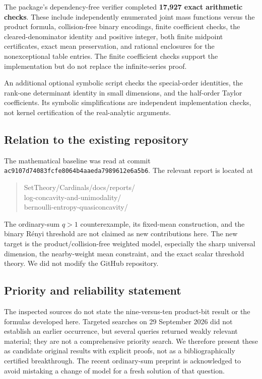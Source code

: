 \documentclass[11pt]{article}
\numberwithin{equation}{section}
\theoremstyle{definition}
\theoremstyle{remark}
\begin{document}
The package's dependency-free verifier completed \textbf{17,927 exact
arithmetic checks}. These include independently enumerated joint mass
functions versus the product formula, collision-free binary encodings,
finite coefficient checks, the cleared-denominator identity and positive
integer, both finite midpoint certificates, exact mean preservation,
and rational enclosures for the nonexceptional table entries. The
finite coefficient checks support the implementation but do not replace
the infinite-series proof.

An additional optional symbolic script checks the special-order
identities, the rank-one determinant identity in small dimensions, and
the half-order Taylor coefficients. Its symbolic simplifications are
independent implementation checks, not kernel certification of the
real-analytic arguments.

\subsection{Relation to the existing repository}
The mathematical baseline was read at commit
\texttt{ac9107d74083fcfe8064b4aaeda7989612e6a5b6}. The relevant report is
located at
\begin{quote}\small\ttfamily
SetTheory/Cardinals/docs/reports/\\
log-concavity-and-unimodality/\\
bernoulli-entropy-quasiconcavity/
\end{quote}
The ordinary-sum $q>1$ counterexample, its fixed-mean construction, and
the binary R\'enyi threshold are not claimed as new contributions here.
The new target is the product/collision-free weighted model, especially
the sharp universal dimension, the nearby-weight mean constraint, and
the exact scalar threshold theory. We did not modify the GitHub
repository.


\subsection{Priority and reliability statement}
The inspected sources do not state the nine-versus-ten product-bit
result or the formulas developed here. Targeted searches on
29 September 2026 did not establish an earlier occurrence, but several
queries returned weakly relevant material; they are not a comprehensive
priority search. We therefore present these as candidate original
results with explicit proofs, not as a bibliographically certified
breakthrough. The recent ordinary-sum preprint is acknowledged to avoid
mistaking a change of model for a fresh solution of that question.
\end{document}

